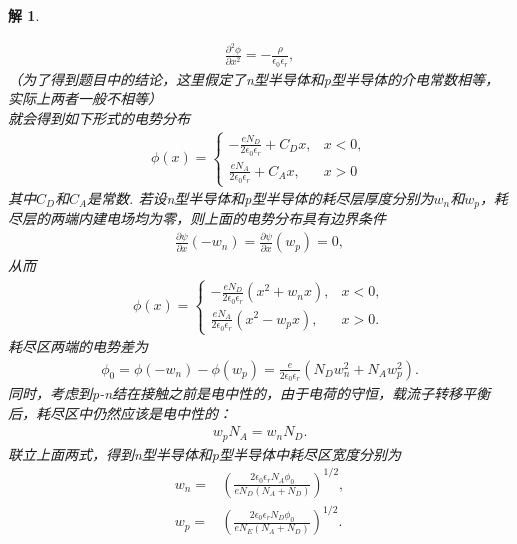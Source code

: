\documentclass[UTF8,10pt,a4paper]{article}
\theoremstyle{Problem}
\theoremstyle{Solution}
\newtheorem*{sol}{解}
\begin{document}
\begin{sol}
\begin{itemize}
        \begin{align}
            \frac{\partial^2\phi}{\partial x^2}=-\frac{\rho}{\epsilon_0\epsilon_r},
        \end{align}
        （为了得到题目中的结论，这里假定了n型半导体和p型半导体的介电常数相等，实际上两者一般不相等）\\
        就会得到如下形式的电势分布
        \begin{align}
            \phi(x)=\left\{\begin{array}{ll}
                -\frac{eN_D}{2\epsilon_0\epsilon_r}+C_Dx,&x<0,\\
                \frac{eN_A}{2\epsilon_0\epsilon_r}+C_Ax,&x>0
            \end{array}\right.
        \end{align}
        其中$C_D$和$C_A$是常数.
        若设n型半导体和p型半导体的耗尽层厚度分别为$w_n$和$w_p$，耗尽层的两端内建电场均为零，则上面的电势分布具有边界条件
        \begin{align}
            \frac{\partial\psi}{\partial x}(-w_n)=\frac{\partial\psi}{\partial x}(w_p)=0,
        \end{align}
        从而
        \begin{align}
            \phi(x)=\left\{\begin{array}{ll}
                -\frac{eN_D}{2\epsilon_0\epsilon_r}(x^2+w_nx),&x<0,\\
                \frac{eN_A}{2\epsilon_0\epsilon_r}(x^2-w_px),&x>0.
            \end{array}\right.
        \end{align}
        耗尽区两端的电势差为
        \begin{align}
            \phi_0=\phi(-w_n)-\phi(w_p)=\frac{e}{2\epsilon_0\epsilon_r}\left(N_Dw_n^2+N_Aw_p^2\right).
        \end{align}
        同时，考虑到p-n结在接触之前是电中性的，由于电荷的守恒，载流子转移平衡后，耗尽区中仍然应该是电中性的：
        \begin{align}
            w_pN_A=w_nN_D.
        \end{align}
        联立上面两式，得到n型半导体和p型半导体中耗尽区宽度分别为
        \begin{align}
            \nonumber w_n=&\left(\frac{2\epsilon_0\epsilon_rN_A\phi_0}{eN_D(N_A+N_D)}\right)^{1/2},\\
            \nonumber w_p=&\left(\frac{2\epsilon_0\epsilon_rN_D\phi_0}{eN_E(N_A+N_D)}\right)^{1/2}.
        \end{align}

\end{itemize}
\end{sol}
\end{document}
